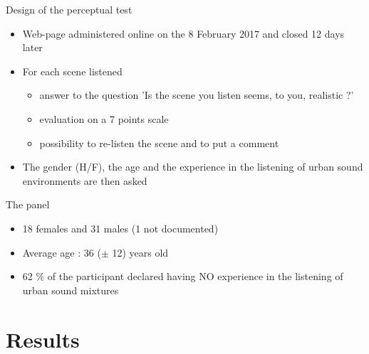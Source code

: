 \documentclass{beamer}
\begin{document}
\begin{frame}{Design of the perceptual test}
\begin{itemize}
	\item Web-page administered online on the 8 February 2017 and closed 12 days later
	\item For each scene listened
	\begin{itemize}
		\item answer to the question 'Is the scene you listen seems, to you, realistic ?'
		\item evaluation on a 7 points scale
		\item possibility to re-listen the scene and to put a comment
	\end{itemize}
	\item The gender (H/F), the age and the experience in the listening of urban sound environments are then asked
\end{itemize}

\begin{block}{The panel}
\begin{itemize}
	\item 18 females and 31 males (1 not documented)
	\item Average age : 36 ($\pm$ 12) years old
	\item 62 $\%$ of the participant declared having NO experience in the listening of urban sound mixtures
\end{itemize}
\end{block}

\end{frame}

\section{Results}
%
%
\end{document}
